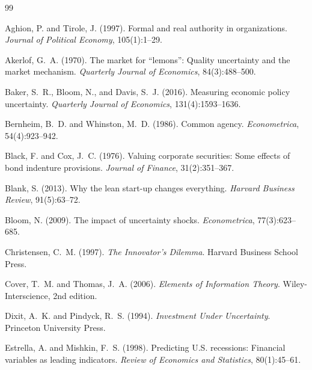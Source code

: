 \documentclass[12pt,a4paper,oneside]{book}
\theoremstyle{definition}
\theoremstyle{remark}
\begin{document}
\begin{thebibliography}{99}

Aghion, P. and Tirole, J. (1997).
\newblock Formal and real authority in organizations.
\newblock \textit{Journal of Political Economy}, 105(1):1--29.

Akerlof, G.~A. (1970).
\newblock The market for ``lemons'': Quality uncertainty and the market mechanism.
\newblock \textit{Quarterly Journal of Economics}, 84(3):488--500.

Baker, S.~R., Bloom, N., and Davis, S.~J. (2016).
\newblock Measuring economic policy uncertainty.
\newblock \textit{Quarterly Journal of Economics}, 131(4):1593--1636.

Bernheim, B.~D. and Whinston, M.~D. (1986).
\newblock Common agency.
\newblock \textit{Econometrica}, 54(4):923--942.

Black, F. and Cox, J.~C. (1976).
\newblock Valuing corporate securities: Some effects of bond indenture provisions.
\newblock \textit{Journal of Finance}, 31(2):351--367.

Blank, S. (2013).
\newblock Why the lean start-up changes everything.
\newblock \textit{Harvard Business Review}, 91(5):63--72.

Bloom, N. (2009).
\newblock The impact of uncertainty shocks.
\newblock \textit{Econometrica}, 77(3):623--685.

Christensen, C.~M. (1997).
\newblock \textit{The Innovator's Dilemma}.
\newblock Harvard Business School Press.

Cover, T.~M. and Thomas, J.~A. (2006).
\newblock \textit{Elements of Information Theory}.
\newblock Wiley-Interscience, 2nd edition.

Dixit, A.~K. and Pindyck, R.~S. (1994).
\newblock \textit{Investment Under Uncertainty}.
\newblock Princeton University Press.

Estrella, A. and Mishkin, F.~S. (1998).
\newblock Predicting {U.S.} recessions: Financial variables as leading indicators.
\newblock \textit{Review of Economics and Statistics}, 80(1):45--61.


\end{thebibliography}
\end{document}
